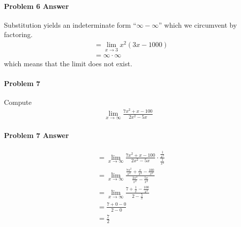 \documentclass[a4paper, 11pt]{article}
\begin{document}

\paragraph{Problem 6 Answer}
Substitution yields an indeterminate form ``$\infty - \infty$'' which we circumvent by factoring.
\begin{align}
    &= \lim_{x\rightarrow 3} x^2(3x - 1000)  \nonumber \\
    &= \infty \cdot \infty \nonumber
\end{align}
which means that the limit does not exist.


\paragraph{Problem 7}
Compute
\begin{align}
    \lim_{x\rightarrow \infty} \frac{7x^2 + x - 100}{2x^2 - 5x}  \nonumber
\end{align}


\paragraph{Problem 7 Answer}
\begin{align}
    &= \lim_{x\rightarrow \infty} \frac{7x^2 + x - 100}{2x^2 - 5x} \cdot \frac{\frac{1}{x^2}}{\frac{1}{x^2}} \nonumber \\
    &= \lim_{x\rightarrow \infty} \frac{\frac{7x^2}{x^2} + \frac{x}{x^2} - \frac{100}{x^2}}{ \frac{2x^2}{x^2} - \frac{5x}{x^2} } \nonumber \\
    &= \lim_{x\rightarrow \infty} \frac{ 7 + \frac{1}{x} - \frac{100}{x^2} }{ 2 - \frac{5}{x} } \nonumber \\
    &= \frac{7 + 0 - 0}{2 - 0} \nonumber \\
    &= \frac{7}{2} \nonumber 
\end{align}

\end{document}
